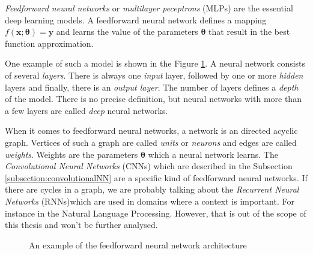 
\textit{Feedforward neural networks} or \textit{multilayer peceptrons} (MLPs) are the essential deep learning models. A feedforward neural network defines a mapping $f (\pmb{x} ; \pmb{\theta}) = \pmb{y}$ and learns the value of the parameters $\pmb{\theta}$ that result in the best function approximation.

One example of such a model is shown in the Figure \ref{fig:basic-cnn}. A neural network consists of several \textit{layers}. There is always one \textit{input} layer, followed by one or more \textit{hidden} layers and finally, there is an \textit{output layer}. The number of layers defines a \textit{depth} of the model. There is no precise definition, but neural networks with more than a few layers are called \textit{deep} neural networks. 

When it comes to feedforward neural networks, a network is an directed acyclic graph. Vertices of such a graph are called \textit{units} or \textit{neurons} and edges are called \textit{weights}. Weights are the parameters $\pmb \theta$ which a neural network learns. The \textit{Convolutional Neural Networks} (CNNs) which are described in the Subsection \ref{subsection:convolutionalNN} are a specific kind of feedforward neural networks. If there are cycles in a graph, we are probably talking about the \textit{Recurrent Neural Networks} (RNNs)which are used in domains where a context is important. For instance in the Natural Language Processing. However, that is out of the scope of this thesis and won't be further analysed.

\begin{figure}

\caption{An example of the feedforward neural network architecture}
\label{fig:basic-cnn}
\end{figure}

